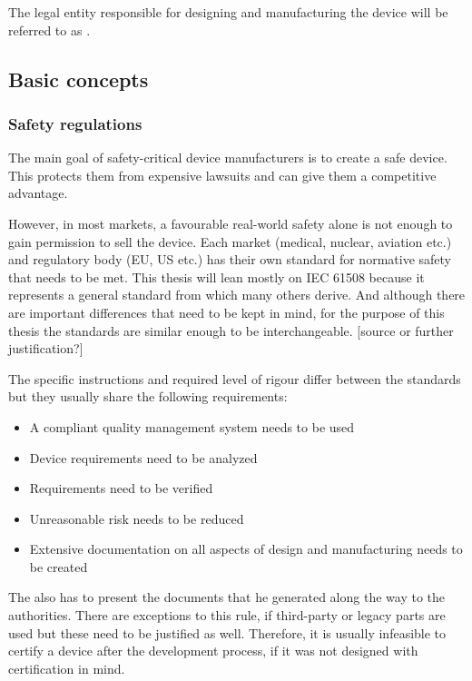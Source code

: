 The legal entity responsible for designing and manufacturing the device will be referred to as \mfg{}.
\subsection{Basic concepts}
\subsubsection{Safety regulations}
The main goal of safety-critical device manufacturers is to create a safe device. This protects them from expensive lawsuits and can give them a competitive advantage.

However, in most markets, a favourable real-world safety alone is not enough to gain permission to sell the device.  Each market (medical, nuclear, aviation etc.) and regulatory body (EU, US etc.) has their own standard for normative safety that needs to be met. This thesis will lean mostly on IEC 61508 \cite{IEC.2010-1}\cite{IEC.2010-2}\cite{IEC.2010-3} because it represents a general standard from which many others derive. And although there are important differences that need to be kept in mind, for the purpose of this thesis the standards are similar enough to be interchangeable. [source or further justification?]

The specific instructions and required level of rigour differ between the standards but they usually share the following requirements:

\begin{itemize}
\item A compliant quality management system needs to be used
\item Device requirements need to be analyzed
\item Requirements need to be verified
\item Unreasonable risk needs to be reduced
\item Extensive documentation on all aspects of design and manufacturing needs to be created
\end{itemize}

The \mfg{} also has to present the documents that he generated along the way to the authorities. There are exceptions to this rule, if third-party or legacy parts are used but these need to be justified as well. Therefore, it is usually infeasible to certify a device after the development process, if it was not designed with certification in mind. 

